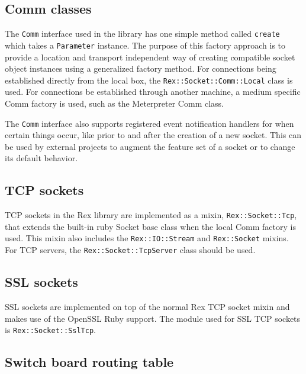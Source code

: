 \documentclass{report}
\begin{document}
        \subsection{Comm classes}

\par
The \texttt{Comm} interface used in the library has one simple
method called \texttt{create} which takes a \texttt{Parameter}
instance.  The purpose of this factory approach is to provide a
location and transport independent way of creating compatible socket
object instances using a generalized factory method.  For
connections being established directly from the local box, the
\texttt{Rex::Socket::Comm::Local} class is used.  For connections be
established through another machine, a medium specific Comm factory
is used, such as the Meterpreter Comm class.

\par
The \texttt{Comm} interface also supports registered event
notification handlers for when certain things occur, like prior to
and after the creation of a new socket.  This can be used by
external projects to augment the feature set of a socket or to
change its default behavior.

        \subsection{TCP sockets}

\par
TCP sockets in the Rex library are implemented as a mixin,
\texttt{Rex::Socket::Tcp}, that extends the built-in ruby Socket
base class when the local Comm factory is used.  This mixin also
includes the \texttt{Rex::IO::Stream} and \texttt{Rex::Socket}
mixins.  For TCP servers, the \texttt{Rex::Socket::TcpServer} class
should be used.

        \subsection{SSL sockets}

\par
SSL sockets are implemented on top of the normal Rex TCP socket
mixin and makes use of the OpenSSL Ruby support.  The module used
for SSL TCP sockets is \texttt{Rex::Socket::SslTcp}.

        \subsection{Switch board routing table}
\end{document}
